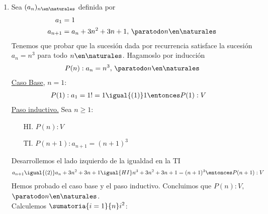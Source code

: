 \begin{enumerate}[label=\roman*)]
    \item Sea $(a_n)_{n \en \naturales }$ definida por
    \setcounter{equation}{0}
    \begin{align}
        a_1 &= 1 \\
        a_{n+1} &= a_n + 3n^2 + 3n + 1,\, \paratodo n \en \naturales 
    \end{align} 
    Tenemos que probar que la sucesión dada por recurrencia satisface la sucesión $a_n = n^3$ para todo $n \en 
    \naturales $. 
    Hagamoslo por inducción
    \begin{align*}
        P(n): a_n = n^3,\, \paratodo n \en \naturales 
    \end{align*}
    \underline{Caso Base}, $n = 1$:
	    \begin{align*}
		    &P(1): a_1 = 1! = 1 \igual{(1)} 1 \entonces P(1):V
	    \end{align*}
	\underline{Paso inductivo.} Sea $n \geq 1$:
	\begin{enumerate}
        \item[HI.] $P(n): V$
        \item[TI.] $P(n+1): a_{n+1} = (n+1)^3$
    \end{enumerate}
 	Desarrollemos el lado izquierdo de la igualdad en la TI
    \begin{align*}
            a_{n+1} \igual{(2)} a_n + 3n^2 + 3n + 1 \igual{HI} n^3 + 3n^2 + 3n + 1 = (n+1)^3 
        \entonces P(n+1):V
    \end{align*}
    Hemos probado el caso base y el paso inductivo. Concluimos que $P(n):V,$ $\paratodo n \en \naturales $. \\

    Calculemos $\displaystyle \sumatoria{i=1}{n} i^2 $:


\end{enumerate}
